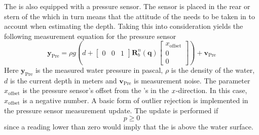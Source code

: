 The \abbrROV is also equipped with a pressure sensor. The sensor is placed in the rear or stern of the \abbrROV which in turn means that the attitude of the \abbrROV needs to be taken in to account when estimating the depth.
Taking this into consideration yields the following measurement equation for the pressure sensor
\begin{equation}
 \boldsymbol{y}_{\text{Pre}}=  \rho g \left(d + \begin{bmatrix}
    0 & 0 & 1
\end{bmatrix} \boldsymbol{R}^n_b(\boldsymbol{q}) 
\begin{bmatrix}
x_{\text{offset}}\\
0\\
0
\end{bmatrix}\right)
    + \boldsymbol{v}_{\text{Pre}}
\end{equation}
Here $\boldsymbol{y}_{\text{Pre}}$ is the measured water pressure in pascal, $\rho$ is the density of the water, $d$ is the current depth in meters and $\boldsymbol{v}_{\text{Pre}}$ is measurement noise. The parameter $x_{\text{offset}}$ is the pressure sensor's offset from the \abbrROV's \abbrCO in the $x$-direction. In this case, $x_{\textrm{offset}}$ is a negative number. A basic form of outlier rejection is implemented in the pressure sensor measurement update. The update is performed if
\begin{equation}
    p \geq 0
\end{equation}
since a reading lower than zero would imply that the \abbrROV is above the water surface.